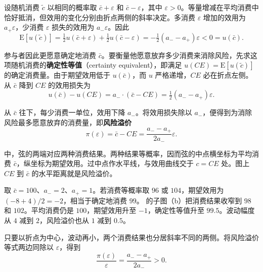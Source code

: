 设随机消费 $\tilde c$ 以相同的概率取 $\bar c+\varepsilon$ 和 $\bar c-\varepsilon$，其中 $\varepsilon>0$。等量增减在平均消费中恰好抵消，但效用的变化分别由折点两侧的斜率决定。多消费 $\varepsilon$ 增加的效用为 $a_+\varepsilon$，少消费 $\varepsilon$ 损失的效用为 $a_-\varepsilon$。因此
\[
 \mathrm E[u(\tilde c)]
 =\tfrac12u(\bar c+\varepsilon)+\tfrac12u(\bar c-\varepsilon)
 =-\tfrac12(a_--a_+)\varepsilon<0=u(\bar c).
\]

参与者因此更愿意确定地消费 $\bar c$。要衡量他愿意放弃多少消费来消除风险，先求这项随机消费的\textbf{确定性等值}（certainty equivalent），即满足 $u(CE)=\mathrm E[u(\tilde c)]$ 的确定消费量。由于期望效用低于 $u(\bar c)$，而 $u$ 严格递增，$CE$ 必在折点左侧。从 $\bar c$ 降到 $CE$ 的效用损失为
\[
 u(\bar c)-u(CE)=a_-\cdot(\bar c-CE)=\tfrac12(a_--a_+)\varepsilon.
\]

从 $\bar c$ 往下，每少消费一单位，效用下降 $a_-$。将效用损失除以 $a_-$，便得到为消除风险最多愿意放弃的消费量，即\textbf{风险溢价}
\[
 \pi(\varepsilon)=\bar c-CE=\frac{a_--a_+}{2a_-}\varepsilon.
\]


 中，弦的两端对应两种消费结果。两种结果等概率，因而弦的中点横坐标为平均消费 $\bar c$，纵坐标为期望效用。过中点作水平线，与效用曲线交于 $c=CE$ 处。图上 $CE$ 到 $\bar c$ 的水平距离就是风险溢价。

\begin{center}
\begin{minipage}{\linewidth}
%
\centering
{}
\end{minipage}
\end{center}

取 $\bar c=100$、$a_-=2$、$a_+=1$。若消费等概率取 $96$ 或 $104$，期望效用为 $(-8+4)/2=-2$，相当于确定地消费 $99$。 的子图（b）把消费结果收窄到 $98$ 和 $102$。平均消费仍是 $100$，期望效用升至 $-1$，确定性等值升至 $99.5$。波动幅度从 $4$ 减到 $2$，风险溢价也从 $1$ 减到 $0.5$。

\begin{center}
\begin{minipage}{\linewidth}
%
\centering
{}
\end{minipage}
\end{center}


只要以折点为中心，波动再小，两个消费结果也分居斜率不同的两侧。将风险溢价等式两边同除以 $\varepsilon$，得到
\[
 \frac{\pi(\varepsilon)}{\varepsilon}
 =\frac{a_--a_+}{2a_-}>0.
\]

